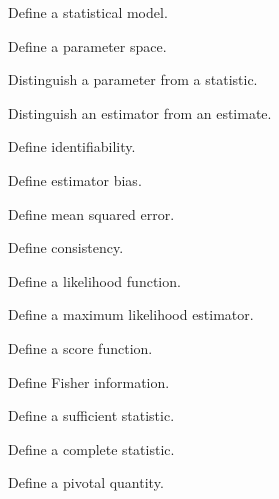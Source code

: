 \begin{exercise}[1]
Define a statistical model.
\end{exercise}

\begin{exercise}[1]
Define a parameter space.
\end{exercise}

\begin{exercise}[1]
Distinguish a parameter from a statistic.
\end{exercise}

\begin{exercise}[1]
Distinguish an estimator from an estimate.
\end{exercise}

\begin{exercise}[1]
Define identifiability.
\end{exercise}

\begin{exercise}[1]
Define estimator bias.
\end{exercise}

\begin{exercise}[1]
Define mean squared error.
\end{exercise}

\begin{exercise}[1]
Define consistency.
\end{exercise}

\begin{exercise}[1]
Define a likelihood function.
\end{exercise}

\begin{exercise}[1]
Define a maximum likelihood estimator.
\end{exercise}

\begin{exercise}[1]
Define a score function.
\end{exercise}

\begin{exercise}[1]
Define Fisher information.
\end{exercise}

\begin{exercise}[1]
Define a sufficient statistic.
\end{exercise}

\begin{exercise}[1]
Define a complete statistic.
\end{exercise}

\begin{exercise}[1]
Define a pivotal quantity.
\end{exercise}

